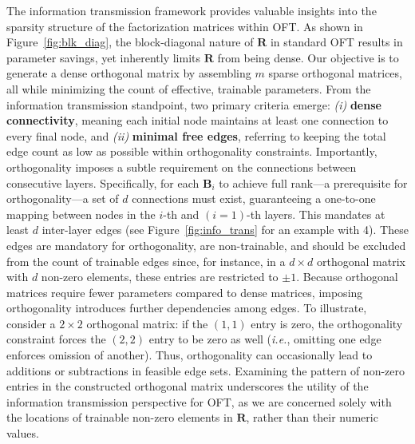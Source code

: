 The information transmission framework provides valuable insights into the sparsity structure of the factorization matrices within OFT. As shown in Figure~\ref{fig:blk_diag}, the block-diagonal nature of $\bm{R}$ in standard OFT results in parameter savings, yet inherently limits $\bm{R}$ from being dense. Our objective is to generate a dense orthogonal matrix by assembling $m$ sparse orthogonal matrices, all while minimizing the count of effective, trainable parameters. From the information transmission standpoint, two primary criteria emerge: \emph{(i)} \textbf{dense connectivity}, meaning each initial node maintains at least one connection to every final node, and \emph{(ii)} \textbf{minimal free edges}, referring to keeping the total edge count as low as possible within orthogonality constraints. Importantly, orthogonality imposes a subtle requirement on the connections between consecutive layers. Specifically, for each $\bm{B}_i$ to achieve full rank—a prerequisite for orthogonality—a set of $d$ connections must exist, guaranteeing a one-to-one mapping between nodes in the $i$-th and $(i=1)$-th layers. This mandates at least $d$ inter-layer edges (see Figure~\ref{fig:info_trans} for an example with 4). These edges are mandatory for orthogonality, are non-trainable, and should be excluded from the count of trainable edges since, for instance, in a $d\times d$ orthogonal matrix with $d$ non-zero elements, these entries are restricted to $\pm 1$. Because orthogonal matrices require fewer parameters compared to dense matrices, imposing orthogonality introduces further dependencies among edges. To illustrate, consider a $2\times 2$ orthogonal matrix: if the $(1,1)$ entry is zero, the orthogonality constraint forces the $(2,2)$ entry to be zero as well (\emph{i.e.}, omitting one edge enforces omission of another). Thus, orthogonality can occasionally lead to additions or subtractions in feasible edge sets. Examining the pattern of non-zero entries in the constructed orthogonal matrix underscores the utility of the information transmission perspective for OFT, as we are concerned solely with the locations of trainable non-zero elements in $\bm{R}$, rather than their numeric values.

